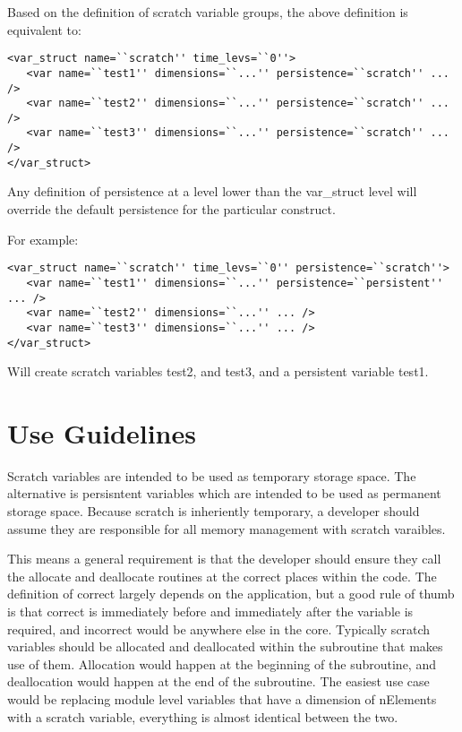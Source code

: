 \documentclass[11pt]{report}
\begin{document}
Based on the definition of scratch variable groups, the above definition is equivalent to:
\begin{lstlisting}
<var_struct name=``scratch'' time_levs=``0''>
   <var name=``test1'' dimensions=``...'' persistence=``scratch'' ... />
   <var name=``test2'' dimensions=``...'' persistence=``scratch'' ... />
   <var name=``test3'' dimensions=``...'' persistence=``scratch'' ... />
</var_struct>
\end{lstlisting}

Any definition of persistence at a level lower than the var\_struct level will override the default persistence for the particular construct.

For example:
\begin{lstlisting}
<var_struct name=``scratch'' time_levs=``0'' persistence=``scratch''>
   <var name=``test1'' dimensions=``...'' persistence=``persistent'' ... />
   <var name=``test2'' dimensions=``...'' ... />
   <var name=``test3'' dimensions=``...'' ... />
</var_struct>
\end{lstlisting}

Will create scratch variables test2, and test3, and a persistent variable test1.
\chapter{Use Guidelines}

Scratch variables are intended to be used as temporary storage space. The
alternative is persisntent variables which are intended to be used as permanent
storage space. Because scratch is inheriently temporary, a developer should
assume they are responsible for all memory management with scratch varaibles. 

This means a general requirement is that the developer should ensure they call
the allocate and deallocate routines at the correct places within the code. The
definition of correct largely depends on the application, but a good rule of
thumb is that correct is immediately before and immediately after the variable
is required, and incorrect would be anywhere else in the core. Typically
scratch variables should be allocated and deallocated within the subroutine
that makes use of them. Allocation would happen at the beginning of the
subroutine, and deallocation would happen at the end of the subroutine. The
easiest use case would be replacing module level variables that have a
dimension of nElements with a scratch variable, everything is almost identical
between the two.
\end{document}
